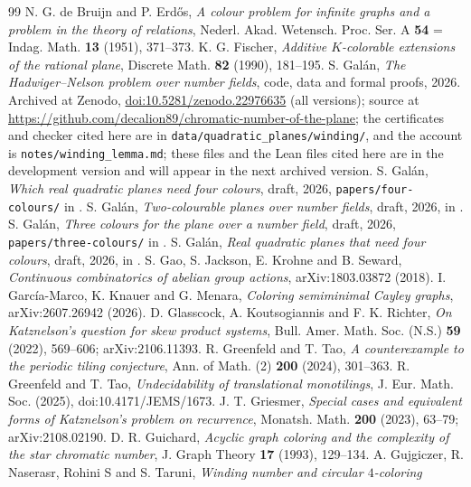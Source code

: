 \documentclass[11pt,a4paper]{amsart}
\theoremstyle{definition}
\begin{document}
\begin{thebibliography}{99}
 N. G. de Bruijn and P. Erd\H{o}s, \emph{A colour problem for infinite graphs and a problem in the
theory of relations}, Nederl. Akad. Wetensch. Proc. Ser. A \textbf{54} = Indag. Math. \textbf{13} (1951),
371--373.
 K. G. Fischer, \emph{Additive $K$-colorable extensions of the rational plane}, Discrete
Math. \textbf{82} (1990), 181--195.
 S. Gal\'an, \emph{The Hadwiger--Nelson problem over number fields}, code, data and formal
proofs, 2026. Archived at Zenodo, \href{https://doi.org/10.5281/zenodo.22976635}{doi:10.5281/zenodo.22976635}
(all versions); source at \url{https://github.com/decalion89/chromatic-number-of-the-plane}; the certificates and
checker cited here are in \texttt{data/quadratic\_planes/winding/}, and the account is
\texttt{notes/winding\_lemma.md}; these files and the Lean files cited here are in the development version and will
appear in the next archived version.
 S. Gal\'an, \emph{Which real quadratic planes need four colours}, draft, 2026,
\texttt{papers/four-colours/} in \cite{Repo}.
 S. Gal\'an, \emph{Two-colourable planes over number fields}, draft, 2026, in \cite{Repo}.
 S. Gal\'an, \emph{Three colours for the plane over a number field}, draft, 2026,
\texttt{papers/three-colours/} in \cite{Repo}.
 S. Gal\'an, \emph{Real quadratic planes that need four colours}, draft, 2026, in \cite{Repo}.
 S. Gao, S. Jackson, E. Krohne and B. Seward, \emph{Continuous combinatorics of abelian group
actions}, arXiv:1803.03872 (2018).
 I. Garc\'ia-Marco, K. Knauer and G. Menara, \emph{Coloring semiminimal Cayley graphs},
arXiv:2607.26942 (2026).
 D. Glasscock, A. Koutsogiannis and F. K. Richter, \emph{On Katznelson's question for skew product
systems}, Bull. Amer. Math. Soc. (N.S.) \textbf{59} (2022), 569--606; arXiv:2106.11393.
 R. Greenfeld and T. Tao, \emph{A counterexample to the periodic tiling conjecture}, Ann. of Math. (2)
\textbf{200} (2024), 301--363.
 R. Greenfeld and T. Tao, \emph{Undecidability of translational monotilings}, J. Eur. Math. Soc.
(2025), doi:10.4171/JEMS/1673.
 J. T. Griesmer, \emph{Special cases and equivalent forms of Katznelson's problem on
recurrence}, Monatsh. Math. \textbf{200} (2023), 63--79; arXiv:2108.02190.
 D. R. Guichard, \emph{Acyclic graph coloring and the complexity of the star chromatic number},
J. Graph Theory \textbf{17} (1993), 129--134.
 A. Gujgiczer, R. Naserasr, Rohini S and S. Taruni, \emph{Winding number and circular $4$-coloring
}
\end{thebibliography}
\end{document}
